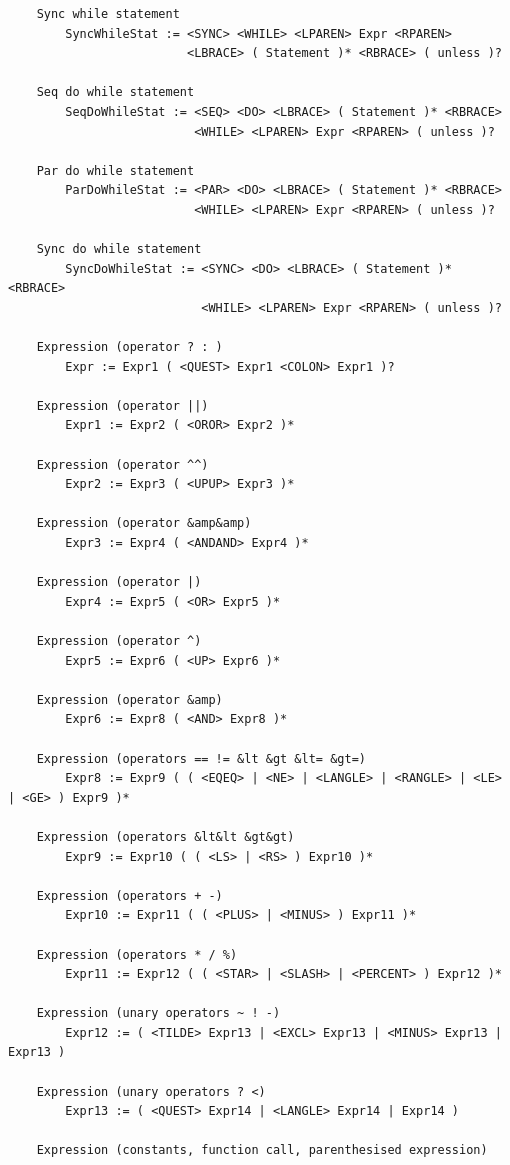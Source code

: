 \begin{verbatim}
    Sync while statement
        SyncWhileStat := <SYNC> <WHILE> <LPAREN> Expr <RPAREN>
                         <LBRACE> ( Statement )* <RBRACE> ( unless )?

    Seq do while statement
        SeqDoWhileStat := <SEQ> <DO> <LBRACE> ( Statement )* <RBRACE>
                          <WHILE> <LPAREN> Expr <RPAREN> ( unless )?

    Par do while statement
        ParDoWhileStat := <PAR> <DO> <LBRACE> ( Statement )* <RBRACE>
                          <WHILE> <LPAREN> Expr <RPAREN> ( unless )?

    Sync do while statement
        SyncDoWhileStat := <SYNC> <DO> <LBRACE> ( Statement )* <RBRACE>
                           <WHILE> <LPAREN> Expr <RPAREN> ( unless )?

    Expression (operator ? : )
        Expr := Expr1 ( <QUEST> Expr1 <COLON> Expr1 )?

    Expression (operator ||)
        Expr1 := Expr2 ( <OROR> Expr2 )*

    Expression (operator ^^)
        Expr2 := Expr3 ( <UPUP> Expr3 )*

    Expression (operator &amp&amp)
        Expr3 := Expr4 ( <ANDAND> Expr4 )*

    Expression (operator |)
        Expr4 := Expr5 ( <OR> Expr5 )*

    Expression (operator ^)
        Expr5 := Expr6 ( <UP> Expr6 )*

    Expression (operator &amp)
        Expr6 := Expr8 ( <AND> Expr8 )*

    Expression (operators == != &lt &gt &lt= &gt=)
        Expr8 := Expr9 ( ( <EQEQ> | <NE> | <LANGLE> | <RANGLE> | <LE> | <GE> ) Expr9 )*

    Expression (operators &lt&lt &gt&gt)
        Expr9 := Expr10 ( ( <LS> | <RS> ) Expr10 )*

    Expression (operators + -)
        Expr10 := Expr11 ( ( <PLUS> | <MINUS> ) Expr11 )*

    Expression (operators * / %)
        Expr11 := Expr12 ( ( <STAR> | <SLASH> | <PERCENT> ) Expr12 )*

    Expression (unary operators ~ ! -)
        Expr12 := ( <TILDE> Expr13 | <EXCL> Expr13 | <MINUS> Expr13 | Expr13 )

    Expression (unary operators ? <)
        Expr13 := ( <QUEST> Expr14 | <LANGLE> Expr14 | Expr14 )

    Expression (constants, function call, parenthesised expression)
   

\end{verbatim}
